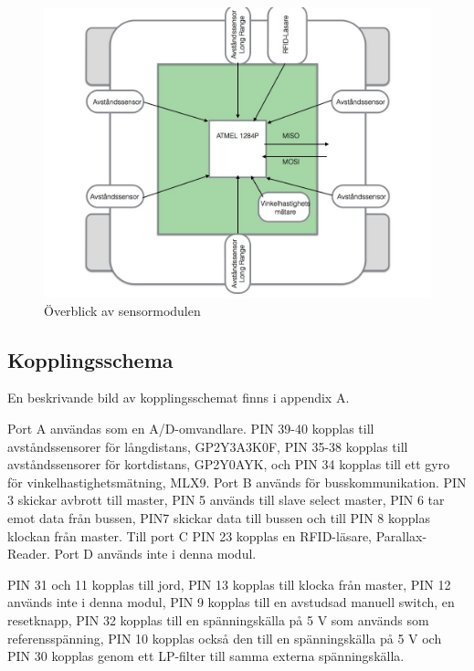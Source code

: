 \documentclass[a4paper,12pt,fleqn]{article}
\begin{document}
\begin{figure}[htp] %
  \begin{center}
  \includegraphics[keepaspectratio=true,width=\linewidth]{overblicksensor}  %
  \end{center}
  \caption{Överblick av sensormodulen} %
  \label{fig:sensoroverview}
\end{figure}

\subsection{Kopplingsschema}

En beskrivande bild av kopplingsschemat finns i appendix A.

Port A användas som en A/D-omvandlare. PIN 39-40 kopplas till avståndssensorer för långdistans, GP\-2Y\-3A\-3K\-0F, PIN 35-38 kopplas till avståndssensorer för kortdistans, GP\-2Y\-0A\-YK, och PIN 34 kopplas till ett gyro för vinkelhastighetsmätning, ML\-X9. Port B används för busskommunikation. PIN 3 skickar avbrott till master, PIN 5 används till slave select master, PIN 6 tar emot data från bussen, PIN7 skickar data till bussen och till PIN 8 kopplas klockan från master. Till port C PIN 23 kopplas en RFID-läsare, Parallax-Reader. Port D används inte i denna modul. 

PIN 31 och 11 kopplas till jord, PIN 13 kopplas till klocka från master, PIN 12 används inte i denna modul, PIN 9 kopplas till en avstudsad manuell switch, en resetknapp, PIN 32 kopplas till en spänningskälla på 5 V som används som referensspänning, PIN 10 kopplas också den till en spänningskälla på 5 V och PIN 30 kopplas genom ett LP-filter till samma externa spänningskälla.
\end{document}
